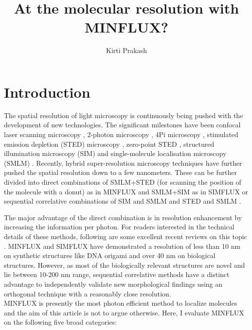 \documentclass[9pt,twocolumn,twoside]{pnas-new}
\title{At the molecular resolution with MINFLUX?}
\author[a,b,*]{Kirti Prakash}
\affil[a]{National Physical Laboratory, TW11 0LW Teddington, UK}
\affil[b]{Department of Chemistry, University of Cambridge, CB2 1EW Cambridge, United Kingdom}
\affil[*]{Correspondence: kirtiprakash2.71@gmail.com, \faTwitter  \href{https://twitter.com/kirtiprakash25}{kirtiprakash25}}
\begin{document}
\verticaladjustment{2pt}

\maketitle
\thispagestyle{firststyle}

\onehalfspacing
\section*{Introduction}
\noindent
The spatial resolution of light microscopy is continuously being pushed with the development of new technologies. The significant milestones have been confocal laser scanning microscopy \citep{minsky1988memoir}, 2-photon microscopy \citep{denk1990two}, 4Pi microscopy \citep{hell1994measurement}, stimulated emission depletion (STED) microscopy \citep{hell1994breaking}, zero-point STED \citep{baer1999method}, structured illumination microscopy (SIM) \citep{heintzmann1999laterally, gustafsson2000surpassing} and single-molecule localisation microscopy (SMLM) \citep{lidke2005superresolution, betzig2006imaging}. Recently, hybrid super-resolution microscopy techniques have further pushed the spatial resolution down to a few nanometers. These can be further divided into direct combinations of SMLM+STED (for scanning the position of the molecule with a donut) as in MINFLUX \citep{balzarotti2017nanometer} and SMLM+SIM as in SIMFLUX \citep{cnossen2020localization, jouchet2019nanometric} or sequential correlative combinations of SIM and SMLM \citep{rossberger2013combination} and STED and SMLM \citep{Prakash121061}.

The major advantage of the direct combination is in resolution enhancement by increasing the information per photon. For readers interested in the technical details of these methods, following are some excellent recent reviews on this topic \citep{reymond2020modulation, schermelleh2019super, sahl2017fluorescence}. MINFLUX and SIMFLUX have demonstrated a resolution of less than 10 nm on synthetic structures like DNA origami and over 40 nm on biological structures. However, as most of the biologically relevant structures are novel and lie between 10-200 nm range, sequential correlative methods have a distinct advantage to independently validate new morphological findings using an orthogonal technique with a reasonably close resolution.\\  
MINFLUX is presently the most photon efficient method to localize molecules and the aim of this article is not to argue otherwise. Here, I evaluate MINFLUX on the following five broad categories:
\end{document}
